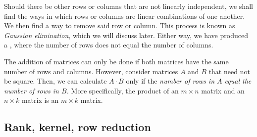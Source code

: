 \documentclass[a4paper, 12pt,oneside,openany]{book}
\begin{document}
Should there be other rows or columns that are not linearly independent, we shall find the ways in which rows or columns are linear combinations of one another. We then find a way to remove said row or column. This process is known as \emph{Gaussian elimination}, which we will discuss later. Either way, we have produced a , where the number of rows does not equal the number of columns.

The addition of matrices can only be done if both matrices have the same number of rows and columns. However, consider matrices $A$ and $B$ that need not be square. Then, we can calculate $A \cdot B$ only if the \emph{number of rows in $A$ equal the number of rows in $B$.} More specifically, the product of an $m \times n$ matrix and an $n \times k$ matrix is an $m \times k$ matrix.


\subsection{Rank, kernel, row reduction}

\end{document}
